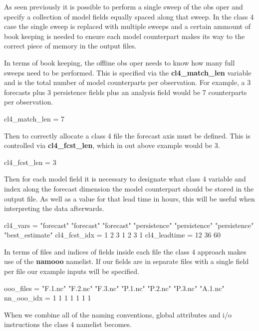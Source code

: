 \documentclass[../tex_main/NEMO_manual]{subfiles}
\begin{document}
As seen previously it is possible to perform a single sweep of the
obs oper and specify a collection of model fields equally spaced 
along that sweep. In the class 4 case the single sweep is replaced
with multiple sweeps and a certain ammount of book keeping is
needed to ensure each model counterpart makes its way to the 
correct piece of memory in the output files.

\noindent
\linebreak
In terms of book keeping, the offline obs oper needs to know how many
full sweeps need to be performed. This is specified via the 
\textbf{cl4\_match\_len} variable and is the total number of model
counterparts per observation. For example, a 3 forecasts plus 3 persistence
fields plus an analysis field would be 7 counterparts per observation.

\begin{forlines}
   cl4_match_len = 7
\end{forlines}

Then to correctly allocate a class 4 file the forecast axis must be defined. This
is controlled via \textbf{cl4\_fcst\_len}, which in out above example would be 3.

\begin{forlines}
   cl4_fcst_len = 3
\end{forlines}

Then for each model field it is necessary to designate what class 4 variable and
index along the forecast dimension the model counterpart should be stored in the
output file. As well as a value for that lead time in hours, this will be useful
when interpreting the data afterwards. 

\begin{forlines}
   cl4_vars = "forecast" "forecast" "forecast" "persistence" "persistence"
              "persistence" "best_estimate"
   cl4_fcst_idx = 1 2 3 1 2 3 1
   cl4_leadtime = 12 36 60 
\end{forlines}

In terms of files and indices of fields inside each file the class 4 approach
makes use of the \textbf{namooo} namelist. If our fields are in separate files
with a single field per file our example inputs will be specified.

\begin{forlines}
   ooo_files = "F.1.nc" "F.2.nc" "F.3.nc" "P.1.nc" "P.2.nc" "P.3.nc" "A.1.nc"
   nn_ooo_idx = 1 1 1 1 1 1 1
\end{forlines}

When we combine all of the naming conventions, global attributes and i/o instructions
the class 4 namelist becomes.
\end{document}
